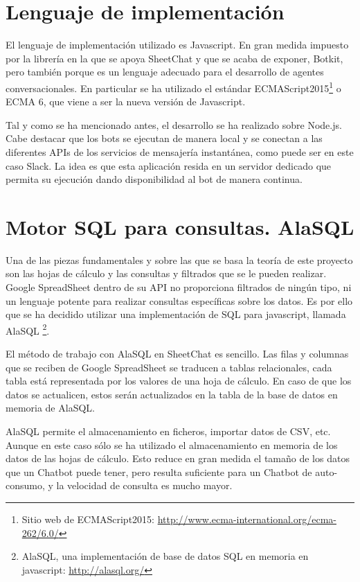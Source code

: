 \section{Lenguaje de implementación}
\label{sec:ImplementationLanguage}

El lenguaje de implementación utilizado es Javascript. En gran medida impuesto por la librería en la que se apoya SheetChat y que se acaba de exponer, Botkit, pero también porque es un lenguaje adecuado para el desarrollo de agentes conversacionales. En particular se ha utilizado el estándar ECMAScript2015\footnote{Sitio web de ECMAScript2015: \url{http://www.ecma-international.org/ecma-262/6.0/}} o ECMA 6, que viene a ser la nueva versión de Javascript.

Tal y como se ha mencionado antes, el desarrollo se ha realizado sobre Node.js. Cabe destacar que los bots se ejecutan de manera local y se conectan a las diferentes APIs de los servicios de mensajería instantánea, como puede ser en este caso Slack. La idea es que esta aplicación resida en un servidor dedicado que permita su ejecución dando disponibilidad al bot de manera continua.

\section{Motor SQL para consultas. AlaSQL}
\label{sec:AlaSQL}

Una de las piezas fundamentales y sobre las que se basa la teoría de este proyecto son las hojas de cálculo y las consultas y filtrados que se le pueden realizar. Google SpreadSheet dentro de su API no proporciona filtrados de ningún tipo, ni un lenguaje potente para realizar consultas específicas sobre los datos. Es por ello que se ha decidido utilizar una implementación de SQL para javascript, llamada AlaSQL \footnote{AlaSQL, una implementación de base de datos SQL en memoria en javascript: \url{http://alasql.org/}}.

El método de trabajo con AlaSQL en SheetChat es sencillo. Las filas y columnas que se reciben de Google SpreadSheet se traducen a tablas relacionales, cada tabla está representada por los valores de una hoja de cálculo. En caso de que los datos se actualicen, estos serán actualizados en la tabla de la base de datos en memoria de AlaSQL.

AlaSQL permite el almacenamiento en ficheros, importar datos de CSV, etc. Aunque en este caso sólo se ha utilizado el almacenamiento en memoria de los datos de las hojas de cálculo. Esto reduce en gran medida el tamaño de los datos que un Chatbot puede tener, pero resulta suficiente para un Chatbot de auto-consumo, y la velocidad de consulta es mucho mayor.

